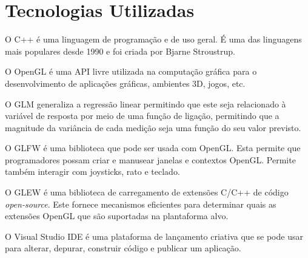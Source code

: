 \section{Tecnologias Utilizadas}
\label{chap2:sec:...}
O C++ é uma linguagem de programação e de uso geral. É uma das linguagens mais populares desde 1990 e foi criada por Bjarne Stroustrup.

O OpenGL é uma \ac{API} livre utilizada na computação gráfica para o desenvolvimento de aplicações gráficas, ambientes 3D, jogos, etc.

O GLM generaliza a regressão linear permitindo que este seja relacionado à variável de resposta por meio de uma função de ligação, permitindo que a magnitude da variância de cada medição seja uma função do seu valor previsto.

O GLFW é uma biblioteca que pode ser usada com OpenGL. Esta permite que programadores possam criar e manusear janelas e contextos OpenGL. Permite também interagir com joysticks, rato e teclado.

O GLEW é uma biblioteca de carregamento de extensões C/C++ de código \textit{open-source}. Este fornece mecanismos eficientes para determinar quais as extensões OpenGL que são suportadas na plantaforma alvo.

O Visual Studio \ac{IDE} é uma plataforma de lançamento criativa que se pode usar para alterar, depurar, construir código e publicar um aplicação.
